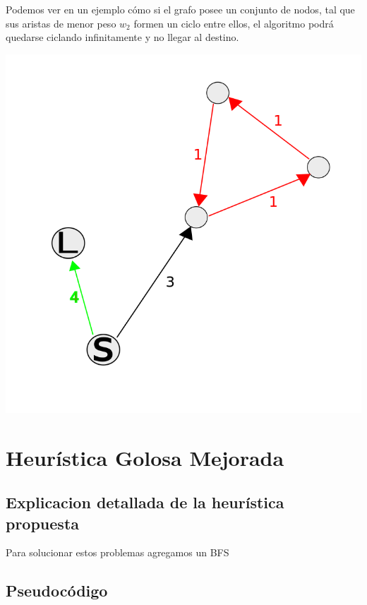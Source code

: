 Podemos ver en un ejemplo c\'omo si el grafo posee un conjunto de nodos, tal que sus aristas de menor peso $w_2$ formen un ciclo entre ellos, el algoritmo podr\'a quedarse ciclando infinitamente y no llegar al destino.

\begin{center}
\includegraphics[scale=0.35]{img/ciclo.png}
\end{center}


\section{Heur\'istica Golosa Mejorada}

\subsection{Explicacion detallada de la heur\'istica propuesta}

Para solucionar estos problemas agregamos un BFS

\subsection{Pseudoc\'odigo}


